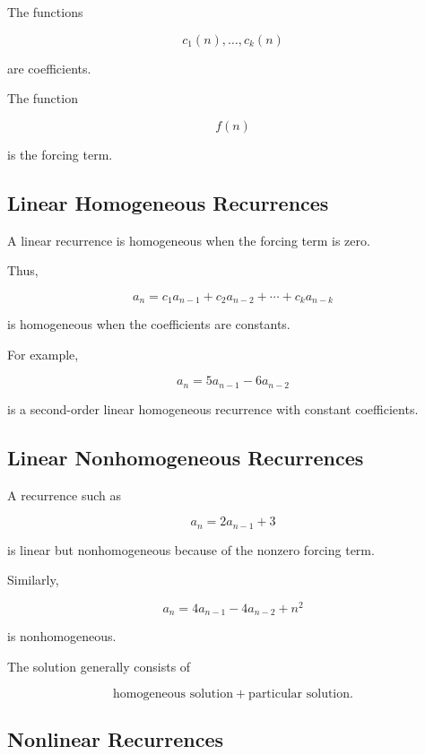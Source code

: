 The functions

\[
c_1(n),\ldots,c_k(n)
\]

are coefficients.

The function

\[
f(n)
\]

is the forcing term.

\subsection{Linear Homogeneous Recurrences}
\label{subsec:linear-homogeneous-recurrences}

A linear recurrence is homogeneous when the forcing term is zero.

Thus,

\[
\boxed{
a_n
=
c_1a_{n-1}
+
c_2a_{n-2}
+\cdots+
c_ka_{n-k}
}
\]

is homogeneous when the coefficients are constants.

For example,

\[
a_n=5a_{n-1}-6a_{n-2}
\]

is a second-order linear homogeneous recurrence with constant
coefficients.

\subsection{Linear Nonhomogeneous Recurrences}
\label{subsec:linear-nonhomogeneous-recurrences}

A recurrence such as

\[
\boxed{
a_n=2a_{n-1}+3
}
\]

is linear but nonhomogeneous because of the nonzero forcing term.

Similarly,

\[
a_n
=
4a_{n-1}
-
4a_{n-2}
+
n^2
\]

is nonhomogeneous.

The solution generally consists of

\[
\boxed{
\text{homogeneous solution}
+
\text{particular solution}.
}
\]

\subsection{Nonlinear Recurrences}
\label{subsec:nonlinear-recurrences}

